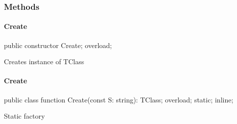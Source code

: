 \documentclass{report}
\begin{document}
\subsubsection*{\large{\textbf{Methods}}\normalsize\hspace{1ex}\hfill}
\paragraph*{Create}\hspace*{\fill}

\begin{list}{}{
\setlength{\itemindent}{0cm}
\setlength{\listparindent}{0cm}
\setlength{\leftmargin}{\evensidemargin}
\addtolength{\leftmargin}{\tmplength}
\settowidth{\labelsep}{X}
\addtolength{\leftmargin}{\labelsep}
\setlength{\labelwidth}{\tmplength}
}
\begin{flushleft}
\item[\textbf{Declaration}\hfill]
\begin{ttfamily}
public constructor Create; overload;\end{ttfamily}


\end{flushleft}
\par
\item[\textbf{Description}]
Creates instance of TClass

\end{list}
\paragraph*{Create}\hspace*{\fill}

\begin{list}{}{
\setlength{\itemindent}{0cm}
\setlength{\listparindent}{0cm}
\setlength{\leftmargin}{\evensidemargin}
\addtolength{\leftmargin}{\tmplength}
\settowidth{\labelsep}{X}
\addtolength{\leftmargin}{\labelsep}
\setlength{\labelwidth}{\tmplength}
}
\begin{flushleft}
\item[\textbf{Declaration}\hfill]
\begin{ttfamily}
public class function Create(const S: string): TClass; overload; static; inline;\end{ttfamily}


\end{flushleft}
\par
\item[\textbf{Description}]
Static factory

\end{list}
\end{document}
